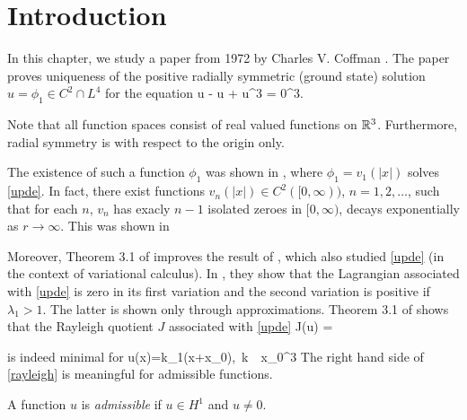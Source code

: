 \section{Introduction}


In this chapter, we study a paper from 1972 by Charles V. Coffman \cite{coffm}. 
The paper proves uniqueness of the positive radially symmetric (ground
state) solution $u=\phi_1\in C^2\cap L^4$ for the equation
\be\label{upde}
\Delta u - u + u^3 = 0\quad{}\R^3.
\ee

Note that all function spaces consist of real valued functions on $\mathbb{R}^3$.
Furthermore, radial symmetry is with respect to the origin only. 

The existence of such a function $\phi_1$ was shown in \cite{nehari},
where $\phi_1=v_1(|x|)$ solves \eqref{upde}. In fact, there exist functions
$v_n(|x|)\in C^2([0, \infty))$, $n=1, 2, \ldots$, such that for each $n$, $v_n$
has exacly $n-1$ isolated zeroes in $[0, \infty)$, decays exponentially as
$r\to\infty$. This was shown in \cite{ryder, berger}

Moreover, Theorem 3.1 of \cite{coffm} improves the result of \cite{robinson}, 
which also studied \eqref{upde} (in the context of variational calculus). 
In \cite{robinson}, they show that the Lagrangian associated with \eqref{upde}
is zero in its first variation and the second variation is positive if
$\lambda_1 > 1$. The latter is shown only through approximations. Theorem 3.1 of
\cite{coffm} shows that the Rayleigh quotient $J$ associated with \eqref{upde}
\be\label{rayleigh} 
J(u) = 
\ee

is indeed minimal for %
\be\label{uts}
u(x)=k\phi_1(x+x_0),\quad{}~k~~x_0\in\R^3
\ee
The right hand side of \eqref{rayleigh} is
meaningful for admissible functions. 

\begin{definition} 
    A function $u$ is \emph{admissible} if $u\in H^1$ and $u\neq 0$.
\end{definition}
